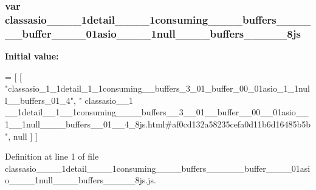 \subsubsection[{classasio\+\_\+\+\_\+1\+\_\+\+\_\+1detail\+\_\+\+\_\+1\+\_\+\+\_\+1consuming\+\_\+\+\_\+\+\_\+\+\_\+buffers\+\_\+\+\_\+3\+\_\+\+\_\+01\+\_\+\+\_\+buffer\+\_\+\+\_\+00\+\_\+\+\_\+01asio\+\_\+\+\_\+1\+\_\+\+\_\+1null\+\_\+\+\_\+\+\_\+\+\_\+buffers\+\_\+\+\_\+01\+\_\+\+\_\+4\+\_\+8js}]{\setlength{\rightskip}{0pt plus 5cm}var classasio\+\_\+\+\_\+\_\+\+\_\+1detail\+\_\+\+\_\+\_\+\+\_\+1consuming\+\_\+\+\_\+\+\_\+\+\_\+buffers\+\_\+\+\_\+\_\+\+\_\+\_\+\+\_\+buffer\+\_\+\+\_\+\_\+\+\_\+01asio\+\_\+\+\_\+\_\+\+\_\+1null\+\_\+\+\_\+\+\_\+\+\_\+buffers\+\_\+\+\_\+\_\+\+\_\+\_\+8js}\label{classasio____1____1detail____1____1consuming________buffers____3____01____buffer____00____01asiof0b616a7ff4e0c89977357fd7ca58f22_aadf21a3dbb3ab48a31dfc11aecd6bb54}
{\bfseries Initial value\+:}
\begin{DoxyCode}
=
[
    [ \textcolor{stringliteral}{"classasio\_1\_1detail\_1\_1consuming\_\_buffers\_3\_01\_buffer\_00\_01asio\_1\_1null\_\_buffers\_01\_4"}, \textcolor{stringliteral}{"
      classasio\_\_1
      \_\_1detail\_\_1\_\_1consuming\_\_\_\_buffers\_\_3\_\_01\_\_buffer\_\_00\_\_01asio\_\_1\_\_1null\_\_\_\_buffers\_\_01\_\_4\_8js.html#af0cd132a58235cefa0d11b6d16485b5b"}, null ]
]
\end{DoxyCode}


Definition at line 1 of file classasio\+\_\+\+\_\+\_\+\+\_\+1detail\+\_\+\+\_\+\_\+\+\_\+1consuming\+\_\+\+\_\+\+\_\+\+\_\+buffers\+\_\+\+\_\+\_\+\+\_\+\_\+\+\_\+buffer\+\_\+\+\_\+\_\+\+\_\+01asio\+\_\+\+\_\+\_\+\+\_\+1null\+\_\+\+\_\+\+\_\+\+\_\+buffers\+\_\+\+\_\+\_\+\+\_\+\_\+8js.\+js.

